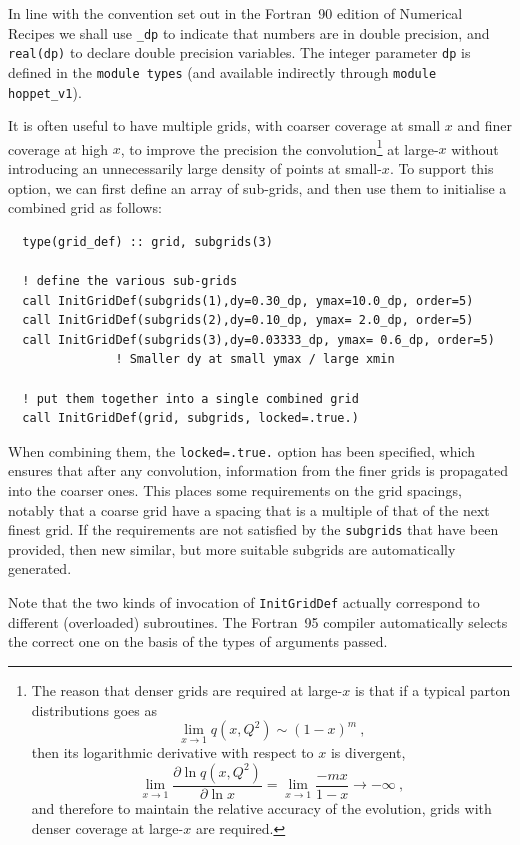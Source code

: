 \documentclass[12pt]{article}
\newcommand{\be}{\begin{equation}}
\newcommand{\ee}{\end{equation}}
\newcommand{\ttt}[1]{\texttt{#1}}
\begin{document}
In line with the convention set out in the Fortran~90 edition of
Numerical Recipes \cite{NRf90} we shall use \texttt{\_dp} to indicate
that numbers are in double precision, and \ttt{real(dp)} to declare
double precision variables. The integer parameter \ttt{dp} is defined
in the \texttt{module types} (and available indirectly through
\ttt{module hoppet\_v1}).

It is often useful to have multiple grids, with
coarser coverage at small $x$ and finer coverage at high $x$, to
improve the precision the convolution\footnote{
The reason that denser grids are required at large-$x$ is that
if a typical parton distributions goes as
\be
\lim_{x\to 1} q(x,Q^2) \sim (1-x)^m \ ,
\ee
then its logarithmic derivative with respect to $x$ is divergent,
\be
\lim_{x \to 1} \frac{\partial  \ln q(x,Q^2) }{\partial \ln x} = 
\lim_{x \to 1} \frac{-mx}{1-x} \to -\infty \ ,
\ee
and therefore to maintain the relative accuracy of the evolution, grids
with denser coverage at large-$x$ are required.} at large-$x$ without
introducing an unnecessarily large density of points
at small-$x$.
To support
this option, we can first define an array of sub-grids, and then use them to
initialise a combined grid as follows:
\begin{lstlisting}
  type(grid_def) :: grid, subgrids(3)

  ! define the various sub-grids
  call InitGridDef(subgrids(1),dy=0.30_dp, ymax=10.0_dp, order=5)
  call InitGridDef(subgrids(2),dy=0.10_dp, ymax= 2.0_dp, order=5)
  call InitGridDef(subgrids(3),dy=0.03333_dp, ymax= 0.6_dp, order=5) 
               ! Smaller dy at small ymax / large xmin 

  ! put them together into a single combined grid
  call InitGridDef(grid, subgrids, locked=.true.)
\end{lstlisting}
When combining them, the \ttt{locked=.true.} option has been specified,
which ensures that after any convolution, information from the finer
grids is propagated into the coarser ones. This places some
requirements on the grid spacings, notably that a coarse grid have a
spacing that is a multiple of that of the next finest grid. If the
requirements are not satisfied by the \ttt{subgrids} that have been
provided, then new similar, but more suitable subgrids are
automatically generated. 

Note that the two kinds of invocation of \ttt{InitGridDef} actually
correspond to different (overloaded) subroutines. The Fortran~95 compiler
automatically selects the correct one on the basis of the types of
arguments passed.
\end{document}
